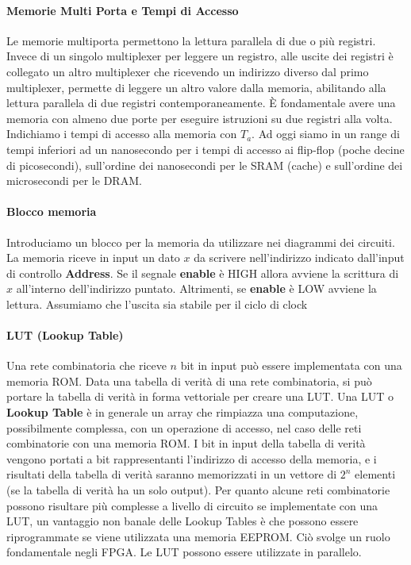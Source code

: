 \paragraph{Memorie Multi Porta e Tempi di Accesso}
Le memorie multiporta permettono la lettura parallela di due o più registri. Invece di un singolo multiplexer per leggere un registro, alle uscite dei registri è collegato un altro multiplexer che ricevendo un indirizzo diverso dal primo multiplexer, permette di leggere un altro valore dalla memoria, abilitando alla lettura parallela di due registri contemporaneamente. È fondamentale avere una memoria con almeno due porte per eseguire istruzioni su due registri alla volta. Indichiamo i tempi di accesso alla memoria con $ T_a $. Ad oggi siamo in un range di tempi inferiori ad un nanosecondo per i tempi di accesso ai flip-flop (poche decine di picosecondi), sull'ordine dei nanosecondi per le SRAM (cache) e sull'ordine dei microsecondi per le DRAM.



\paragraph{Blocco memoria}
Introduciamo un blocco per la memoria da utilizzare nei diagrammi dei circuiti.
La memoria riceve in input un dato $ x $ da scrivere nell'indirizzo indicato dall'input di controllo \textbf{Address}. Se il segnale \textbf{enable} è HIGH allora avviene la scrittura di $ x $ all'interno dell'indirizzo puntato. Altrimenti, se \textbf{enable} è LOW avviene la lettura. Assumiamo che l'uscita sia stabile per il ciclo di clock

\paragraph{LUT (Lookup Table)}
Una rete combinatoria che riceve $ n $ bit in input può essere implementata con una memoria ROM. Data una tabella di verità di una rete combinatoria, si può portare la tabella di verità in forma vettoriale per creare una LUT.
Una LUT o \textbf{Lookup Table} è in generale un array che rimpiazza una computazione, possibilmente complessa, con un operazione di accesso, nel caso delle reti combinatorie con una memoria ROM.
I bit in input della tabella di verità vengono portati a bit rappresentanti l'indirizzo di accesso della memoria, e i risultati della tabella di verità saranno memorizzati in un vettore di $ 2^n $ elementi (se la tabella di verità ha un solo output). 
Per quanto alcune reti combinatorie possono risultare più complesse a livello di circuito se implementate con una LUT, un vantaggio non banale delle Lookup Tables è che possono essere riprogrammate se viene utilizzata una memoria EEPROM. Ciò svolge un ruolo fondamentale negli FPGA. Le LUT possono essere utilizzate in parallelo.

